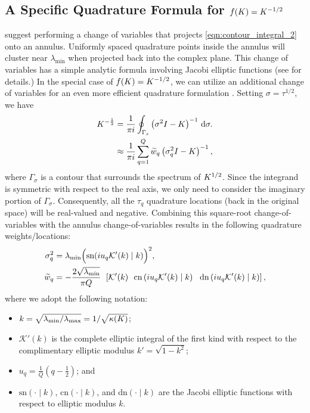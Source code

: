 \subsection{A Specific Quadrature Formula for $f(K) = K^{-1/2}$}
\citet{hale2008computing} suggest performing a change of variables that projects \cref{eqn:contour_integral_2} onto an annulus.
Uniformly spaced quadrature points inside the annulus will cluster near $\lambda_\text{min}$ when projected back into the complex plane.
This change of variables has a simple analytic formula involving Jacobi elliptic functions (see \citep[][Sec. 2]{hale2008computing} for details.)
In the special case of $f(K) = K^{-1/2}$, we can utilize an additional change of variables for an even more efficient quadrature formulation \citep[][Sec. 4]{hale2008computing}.
Setting $\sigma = \tau^{1/2}$, we have
%
\begin{align}
	K^{-\frac 1 2}
  &= \frac{1}{\pi i} \oint_{\Gamma_s} \left( \sigma^2 I - K \right)^{-1} \,\mathrm{d}{\sigma}.
  \nonumber
  \\
  &\approx
  \frac{1}{\pi i} \sum_{q=1}^Q \widetilde w_q \left( \sigma_q^2 I - K \right)^{-1},
  \label{eqn:contour_integral_quad_3}
\end{align}
%
where $\Gamma_\sigma$ is a contour that surrounds the spectrum of $K^{1/2}$.
Since the integrand is symmetric with respect to the real axis, we only need to consider the imaginary portion of $\Gamma_\sigma$.
Consequently, all the $\tau_q$ quadrature locations (back in the original space) will be real-valued and negative.
Combining this square-root change-of-variables with the annulus change-of-variables results in the following quadrature weights/locations:
%
\begin{equation}
  \begin{split}
    \sigma_q^2
    &= \lambda_\text{min} \Bigl( \text{sn}(i u_q \mathcal{K}'(k) \mid k) \Bigr)^2,
    \\
    \widetilde w_q
    &= -\frac{ 2 \sqrt{\lambda_\text{min}} }{ \pi Q }
    \:\: \left[
    \mathcal{K}'( k )
    \:\:\: \text{cn} \left( i u_q \mathcal{K}'(k) \mid k \right)
    \:\:\: \text{dn} \left( i u_q \mathcal{K}'(k) \mid k \right)
    \right],
  \end{split}
  \label{eqn:quad_points_and_locations}
\end{equation}
%
where we adopt the following notation:
\begin{itemize}
  \item $k = \sqrt{ \lambda_\text{min} / \lambda_\text{max} } = 1 / \sqrt{ \kappa(K) }$;
  \item $\mathcal{K}'(k)$ is the complete elliptic integral of the first kind with respect to the complimentary elliptic modulus $k' = \sqrt{1 - k^2}$;
  \item $u_q = \frac{1}{Q}(q - \frac 1 2)$; and
  \item $\text{sn}(\cdot \mid k)$, $\text{cn}(\cdot \mid k )$, and $\text{dn}(\cdot \mid k)$ are the Jacobi elliptic functions with respect to elliptic modulus $k$.
\end{itemize}

